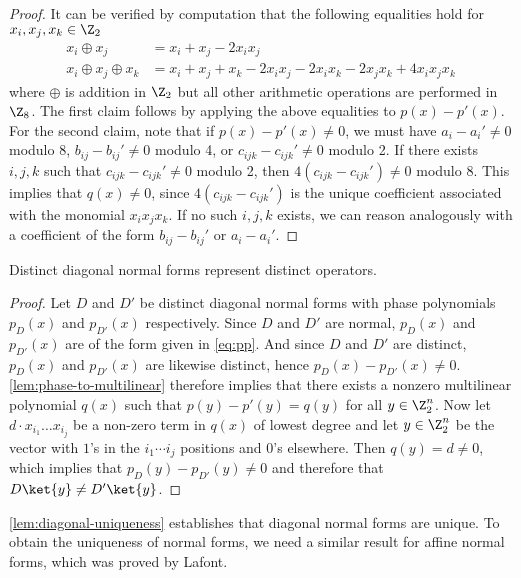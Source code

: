 \documentclass{eptcs}
\begin{document}
\begin{proof}
  It can be verified by computation that the following equalities hold
  for $x_i,x_j,x_k\in\Z_2$
  \begin{align*}
    x_i\oplus x_j &= x_i + x_j - 2x_ix_j \\
    x_i\oplus x_j\oplus x_k &= x_i + x_j + x_k - 2x_ix_j - 2x_ix_k - 
                              2x_jx_k + 4x_ix_jx_k
  \end{align*}
  where $\oplus$ is addition in $\Z_2$ but all other arithmetic
  operations are performed in $\Z_8$. The first claim follows by
  applying the above equalities to $p(x) - p'(x)$. For the second
  claim, note that if $p(x)-p'(x)\neq 0$, we must have
  $a_i-a_i'\neq 0$ modulo 8, $b_{ij}-b_{ij}'\neq 0$ modulo 4, or
  $c_{ijk}-c_{ijk}'\neq 0$ modulo 2. If there exists $i,j,k$ such that
  $c_{ijk}-c_{ijk}'\neq 0$ modulo 2, then $4(c_{ijk}-c_{ijk}')\neq 0$
  modulo 8. This implies that $q(x)\neq 0$, since
  $4(c_{ijk}-c_{ijk}')$ is the unique coefficient associated with the
  monomial $x_ix_jx_k$. If no such $i,j,k$ exists, we can reason
  analogously with a coefficient of the form $b_{ij}-b_{ij}'$ or
  $a_i - a_i'$.
\end{proof}

\begin{lemma}
  \label{lem:diagonal-uniqueness}
  Distinct diagonal normal forms represent distinct operators.
\end{lemma}

\begin{proof}
  Let $D$ and $D'$ be distinct diagonal normal forms with phase
  polynomials $p_D(x)$ and $p_{D'}(x)$ respectively. Since $D$ and
  $D'$ are normal, $p_D(x)$ and $p_{D'}(x)$ are of the form given in
  \cref{eq:pp}. And since $D$ and $D'$ are distinct, $p_D(x)$ and
  $p_{D'}(x)$ are likewise distinct, hence $p_D(x) - p_{D'}(x)\neq
  0$. \cref{lem:phase-to-multilinear} therefore implies that there
  exists a nonzero multilinear polynomial $q(x)$ such that
  $p(y) - p'(y)= q(y)$ for all $y\in\Z_2^n$. Now let
  $d \cdot x_{i_1}\ldots x_{i_j}$ be a non-zero term in $q(x)$ of
  lowest degree and let $y\in\Z_2^n$ be the vector with $1$'s in the
  $i_1\cdots i_j$ positions and $0$'s elsewhere. Then
  $q(y) = d \neq 0$, which implies that $p_D(y)-p_{D'}(y)\neq 0$ and
  therefore that $D\ket{y}\neq D'\ket{y}$.
\end{proof}

\cref{lem:diagonal-uniqueness} establishes that diagonal normal forms
are unique. To obtain the uniqueness of normal forms, we need a
similar result for affine normal forms, which was proved by Lafont.
\end{document}
